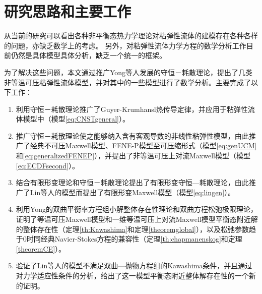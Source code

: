 \section{研究思路和主要工作}
从当前的研究可以看出各种非平衡态热力学理论对粘弹性流体的建模存在各种各样的问题，亦缺乏数学上的考虑。%
另外，对粘弹性流体力学方程的数学分析工作目前仍然是具体模型具体分析，缺乏一个统一的框架。

为了解决这些问题，本文通过推广Yong等人发展的守恒－耗散理论，提出了几类非等温可压粘弹性流体模型，并对其中的一些模型进行了数学分析。主要完成了以下工作：
\begin{enumerate}
\item 利用守恒－耗散理论推广了Guyer-Krumhansl热传导定律，并应用于粘弹性流体模型中（模型\eqref{eq:CNSTgeneral}）。
\item 推广守恒－耗散理论使之能够纳入含有客观导数的非线性粘弹性模型，由此推广了经典不可压Maxwell模型、FENE-P模型至可压缩形式（模型\eqref{eq:genUCM}和\eqref{eq:generalizedFENEP}），并提出了非等温可压上对流Maxwell模型（模型\eqref{eq:ECDFsecond}）。
\item 结合有限形变理论和守恒－耗散理论提出了有限形变守恒—耗散理论，由此推广了Lin等人的模型而提出了有限形变Maxwell模型（模型\eqref{eq:lingen}）。
\item 利用Yong的双曲平衡率方程组小解整体存在性理论和双曲方程松弛极限理论，证明了等温可压Maxwell模型和一维等温可压上对流Maxwell模型平衡态附近解的整体存在性（定理\ref{th:Kawashima}和定理\ref{theoremglobal}），以及松弛参数趋于$0$时同经典Navier-Stokes方程的兼容性（定理\ref{th:chapmanenskog}和定理\ref{theoremCE}）。
\item 验证了Lin等人的模型不满足双曲—抛物方程组的Kawashima条件，并且通过对力学适应性条件的分析，给出了这一模型平衡态附近整体解存在性的一个新的证明。
\end{enumerate}

